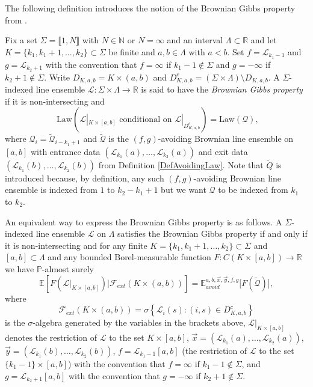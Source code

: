 The following definition introduces the notion of the Brownian Gibbs property from \cite{CorHamA}.
\begin{definition}\label{DefBGP}
Fix a set $\Sigma = \llbracket 1, N \rrbracket$ with $N \in \mathbb{N}$ or $N = \infty$ and an interval $\Lambda \subset \mathbb{R}$ and let $K = \{k_1, k_1 + 1, \dots, k_2 \} \subset \Sigma$ be finite and $a,b \in \Lambda$ with $a < b$. Set $f = \mathcal{L}_{k_1 - 1}$ and $g = \mathcal{L}_{k_2 + 1}$ with the convention that $f = \infty$ if $k_1 - 1 \not \in \Sigma$ and $g = -\infty$ if $k_2 +1 \not \in \Sigma$. Write $D_{K,a,b} = K \times (a,b)$ and $D_{K,a,b}^c = (\Sigma \times \Lambda) \setminus D_{K,a,b}$. A $\Sigma$-indexed line ensemble $\mathcal{L} : \Sigma \times \Lambda \rightarrow \mathbb{R}$ is said to have the {\em Brownian Gibbs property} if it is non-intersecting and 
$$\mbox{ Law}\left( \mathcal{L}|_{K \times [a,b]} \mbox{ conditional on } \mathcal{L}|_{D^c_{K,a,b}} \right)= \mbox{Law} \left( \mathcal{Q} \right),$$
where $\mathcal{Q}_i = \tilde{\mathcal{Q}}_{i - k_1 + 1}$ and $\tilde{\mathcal{Q}}$ is the $(f,g)$-avoiding Brownian line ensemble on $[a,b]$ with entrance data $(\mathcal{L}_{k_1}(a), \dots, \mathcal{L}_{k_2}(a))$ and exit data $(\mathcal{L}_{k_1}(b), \dots, \mathcal{L}_{k_2}(b))$ from Definition \ref{DefAvoidingLaw}. Note that $\tilde{Q}$ is introduced because, by definition, any such $(f,g)$-avoiding Brownian line ensemble is indexed from $1$ to $k_2 - k_1 + 1$ but we want $\mathcal{Q}$ to be indexed from $k_1$ to $k_2$.

An equivalent way to express the Brownian Gibbs property is as follows. A $\Sigma$-indexed line ensemble $\mathcal{L}$ on $\Lambda$ satisfies the Brownian Gibbs property if and only if it is non-intersecting and for any finite $K = \{k_1, k_1 + 1, \dots, k_2 \} \subset \Sigma$ and $[a,b] \subset \Lambda$ and any bounded Borel-measurable function $F: C(K \times [a,b]) \rightarrow \mathbb{R}$ we have $\mathbb{P}$-almost surely
\begin{equation}\label{BGPTower}
\mathbb{E} \left[ F\left(\mathcal{L}|_{K \times [a,b]} \right)  {\big \vert} \mathcal{F}_{ext} (K \times (a,b))  \right] =\mathbb{E}_{avoid}^{a,b, \vec{x}, \vec{y}, f, g} \bigl[ F(\tilde{\mathcal{Q}}) \bigr],
\end{equation}
where
$$\mathcal{F}_{ext} (K \times (a,b)) = \sigma \left \{ \mathcal{L}_i(s): (i,s) \in D_{K,a,b}^c \right\}$$
is the $\sigma$-algebra generated by the variables in the brackets above, $ \mathcal{L}|_{K \times [a,b]}$ denotes the restriction of $\mathcal{L}$ to the set $K \times [a,b]$, $\vec{x} = (\mathcal{L}_{k_1}(a), \dots, \mathcal{L}_{k_2}(a))$, $\vec{y} = (\mathcal{L}_{k_1}(b), \dots, \mathcal{L}_{k_2}(b))$, $f = \mathcal{L}_{k_1 - 1}[a,b]$ (the restriction of $\mathcal{L}$ to the set $\{k_1 - 1 \} \times [a,b]$) with the convention that $f = \infty$ if $k_1 - 1 \not \in \Sigma$, and $g = \mathcal{L}_{k_2 +1}[a,b]$ with the convention that $g =-\infty$ if $k_2 +1 \not \in \Sigma$. 
\end{definition}
